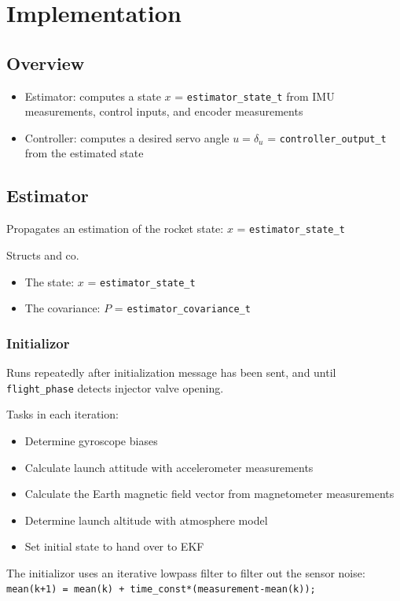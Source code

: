 \section{Implementation}
\subsection{Overview}
\begin{itemize}
    \item Estimator: computes a state $x$ = \texttt{estimator\_state\_t} from IMU measurements, control inputs, and encoder measurements
    \item Controller: computes a desired servo angle $u = \delta_u$ = \texttt{controller\_output\_t} from the estimated state
\end{itemize}

\subsection{Estimator}
Propagates an estimation of the rocket state: $x$ = \texttt{estimator\_state\_t}

Structs and co.
\begin{itemize}
    \item The state: $x$ = \texttt{estimator\_state\_t}
    \item The covariance: $P$ = \texttt{estimator\_covariance\_t}
\end{itemize}

\subsubsection{Initializor}
Runs repeatedly after initialization message has been sent, and until \texttt{flight\_phase} detects injector valve opening.

Tasks in each iteration:
\begin{itemize}
    \item Determine gyroscope biases
    \item Calculate launch attitude with accelerometer measurements
    \item Calculate the Earth magnetic field vector from magnetometer measurements
    \item Determine launch altitude with atmosphere model
    \item Set initial state to hand over to EKF
\end{itemize}
The initializor uses an iterative lowpass filter to filter out the sensor noise: \\
\texttt{mean(k+1) = mean(k) + time\_const*(measurement-mean(k));} 

